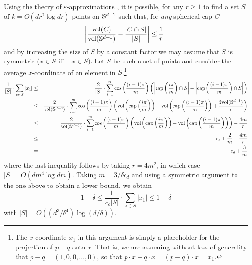 \documentclass[charterfonts,lotsofwhite]{patmorin}
\newcommand{\eps}{\varepsilon}
\begin{document}
Using the theory of $\eps$-approximations \cite[Chapter~4]{c00}, it is
possible, for any $r\ge 1$ to find a set $S$ of $k=O(dr^2\log dr)$
points on $\mathbb{S}^{d-1}$ such that, for \emph{any} spherical cap $C$
\[
    \left|\frac{\mathrm{vol}(C)}{\mathrm{vol}(\mathbb{S}^{d-1})} - \frac{|C\cap S|}{|S|} \right| 
              \le \frac{1}{r}  \enspace 
\]
and by increasing the size of $S$ by a constant factor we may assume
that $S$ is symmetric ($x\in S$ iff $-x\in S$).
Let $S$ be such a set of points and consider the average
$x$-coordinate of an element in $S$.\footnote{The $x$-coordinate $x_1$
in this argument is simply a placeholder for the projection of $p-q$
onto $x$. That is, we are assuming without loss of generality that
$p-q=(1,0,0,\ldots,0)$, so that $p\cdot x - q\cdot x=(p-q)\cdot x=x_1$.}
\begin{eqnarray*}
\frac{1}{|S|}\cdot \sum_{x\in S} |x_1|
  \comment{ & = & \frac{2}{|S|}\cdot\sum_{i=1}^m
          \sum\left\{x_1: x\in
              S\cap\ccap\left(\frac{i\pi}{m}\right) 
                \setminus\ccap\left(\frac{(i-1)\pi}{m}\right)
          \right\} \\ }
  & \le & \frac{2}{|S|}\cdot
         \sum_{i=1}^m\cos\left(\frac{(i-1)\pi}{m}\right)
           \left(
             \left|\ccap\left(\frac{i\pi}{m}\right)\cap S\right| -
             \left|\ccap\left(\frac{(i-1)\pi}{m}\right)\cap S\right|
           \right) \\
  & \le & \frac{2}{\area(\Sd)}\cdot
         \sum_{i=1}^m\cos\left(\frac{(i-1)\pi}{m}\right)
           \left(
             \area\left(\ccap\left(\frac{i\pi}{m}\right)\right) -
             \area\left(\ccap\left(\frac{(i-1)\pi}{m}\right)\right) +
             \frac{2\area(\Sd)}{r}
           \right) \\
  & \le & \frac{2}{\area(\Sd)}\cdot
         \sum_{i=1}^m\cos\left(\frac{(i-1)\pi}{m}\right)
           \left(
             \area\left(\ccap\left(\frac{i\pi}{m}\right)\right) -
             \area\left(\ccap\left(\frac{(i-1)\pi}{m}\right)\right)
           \right) + \frac{4m}{r} \\
  & \le & c_d + \frac{2}{m} + \frac{4m}{r} \\
  & = & c_d + \frac{3}{m} 
\end{eqnarray*}
where the last inequality follows by taking $r=4m^2$, in which case
$|S|=O(dm^4\log dm)$.  Taking $m=3/\delta c_d$ and using a symmetric
argument to the one above to obtain a lower bound, we obtain
\[
  1-\delta \le \frac{1}{c_d|S|}\cdot\sum_{x\in S}|x_1| \le 1 + \delta
\]
with $|S|=O((d^3/\delta^4)\log(d/\delta))$.  
\end{document}
